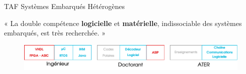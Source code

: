 \documentclass[t,compress,mathserif,12pt,xcolor=dvipsnames]{beamer}
\newcommand{\RED} [1]{\textcolor{Paired-5}{\textbf{#1}}}
\newcommand{\BLUE} [1]{\textcolor{bleuUni}{\textbf{#1}}}
\begin{document}
\begin{frame}[t]{TAF Systèmes Embarqués Hétérogènes}
  \begin{minipage}[t][5.0cm][t]{\textwidth}
  \centering
  \vspace{0.8cm}
    « La double compétence \BLUE{logicielle} et \RED{matérielle}, indissociable des systèmes embarqués, est très recherchée. »
  \end{minipage}
  \begin{figure}[htp]
    \centering
    \includegraphics[width=\textwidth]{fig/frise12}
  \end{figure}
\end{frame}
\end{document}
